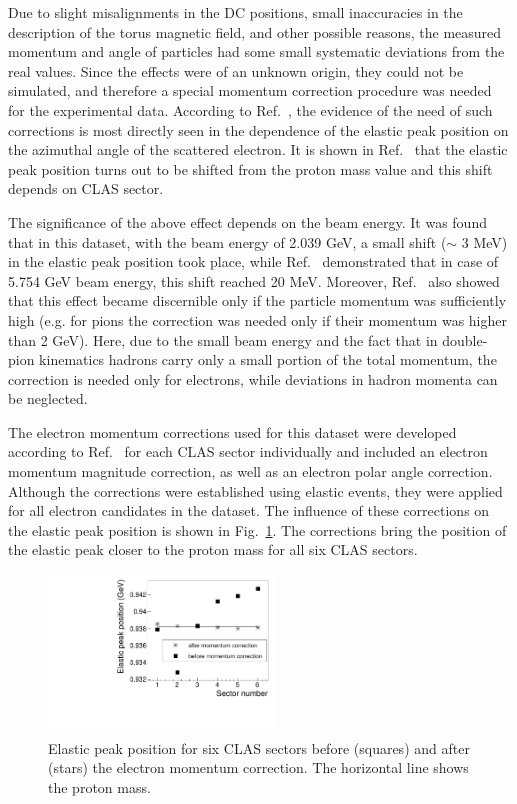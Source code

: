 \documentclass[prc,twocolumn,superscriptaddress,showpacs,amssymb,amsmath,amsfonts,aps,nofootinbib]{revtex4-1}
\begin{document}
Due to slight misalignments in the DC positions,  small inaccuracies in
the description of the torus magnetic field, and other possible reasons, the measured momentum and angle of
particles had some small systematic deviations from the real values. 
Since the effects were of an unknown origin, they could not be simulated, and therefore a special  momentum correction procedure was needed for the experimental data. 
According to Ref.~\cite{KPark:momcorr}, the evidence of the need of such corrections is most directly seen in the dependence of the elastic peak position on the azimuthal angle of the scattered electron. It is shown in Ref.~\cite{KPark:momcorr} that the elastic peak position turns out to be shifted from the proton mass value and this shift depends on CLAS sector. 

The significance of the above effect depends on the beam energy. It was found that in this dataset, with the beam energy of 2.039 GeV,  a small shift ($\sim$ 3 MeV) in the elastic peak position took place, while Ref.~\cite{KPark:momcorr} demonstrated that in case of  5.754 GeV beam energy, this shift reached 20 MeV. Moreover, Ref.~\cite{KPark:momcorr} also showed that this effect became discernible only if the particle momentum was sufficiently high (e.g. for pions the correction was needed only if their momentum was higher than 2 GeV). Here, due to the small beam energy and the fact that in double-pion kinematics hadrons carry only a small portion of the total momentum, the correction is needed only for electrons, while deviations in hadron momenta can be neglected.

The electron momentum corrections used for this dataset were developed according to Ref.~\cite{KPark:momcorr} for each CLAS sector individually and included an electron momentum magnitude correction, as well as an electron polar angle correction. Although the corrections were established using elastic events, they were applied for all electron candidates in the dataset.  The influence of these corrections on the elastic peak position is shown in Fig.~\ref{fig:elast_pic_position}. The corrections bring the position of the elastic peak closer to the proton mass for all six CLAS sectors.


\begin{figure}[htp]
\begin{center}
 \includegraphics[width=6cm,keepaspectratio]{pictures/mom_corr/elast_pic_position.pdf}
\vspace{-0.1cm}
\caption{Elastic peak position for six CLAS sectors before (squares) and after (stars) the electron momentum correction. The horizontal line shows the proton mass. }
\label{fig:elast_pic_position}
\end{center}
\end{figure} 
\end{document}
